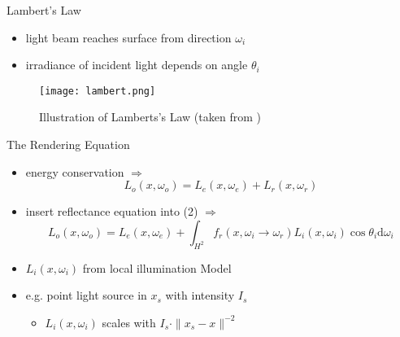 \begin{frame}{Lambert's Law}
\begin{itemize}
\item light beam reaches surface from direction  $\omega_i$ 
\item irradiance of incident light depends on angle $\theta_i$
\end{itemize}
\begin{center}
\begin{figure}
    \texttt{[image: lambert.png]}
    \caption{Illustration of Lamberts's Law (taken from \cite{Pharr.2023})}
\end{figure}
\end{center}
\end{frame}

\begin{frame}{The Rendering Equation}
\begin{itemize}
\item energy conservation $\Rightarrow$
\begin{equation}
L_o(x, \omega_o) =  L_e(x, \omega_e) +  L_r(x, \omega_r)
\end{equation}
\item insert reflectance equation into (2) $\Rightarrow$
\begin{equation} L_o(x, \omega_o) =  L_e(x, \omega_e) + \int_{H^2} f_r(x, \omega_i \rightarrow \omega_r) L_i(x, \omega_i) \cos \theta_i \mathrm{d}\omega_i 
\end{equation}
\item $L_i(x, \omega_i)$ from local illumination Model 
\item e.g. point light source in $x_s$ with intensity $I_s$ 
\begin{itemize}
    \item $L_i(x, \omega_i)$  scales with $I_s \cdot \|x_s -x\|^{-2}$
\end{itemize}
\end{itemize}
\end{frame}

